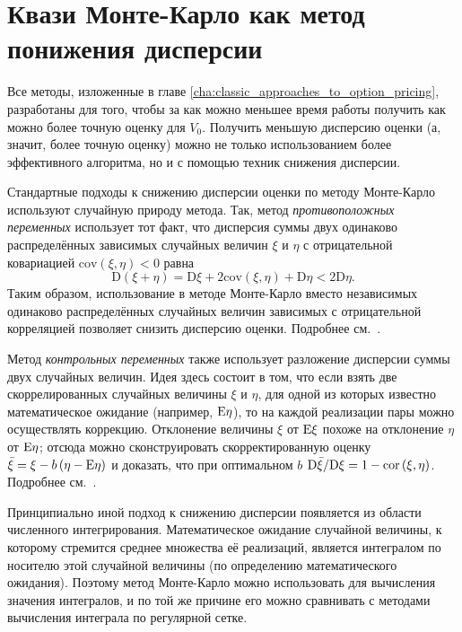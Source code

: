 \chapter{Квази Монте-Карло как метод понижения дисперсии} %
\label{cha:QMC_for_variance_reduction}

Все методы, изложенные в главе \ref{cha:classic_approaches_to_option_pricing}, разработаны для того, чтобы за как можно меньшее время работы получить как можно более точную оценку для $V_0$. Получить меньшую дисперсию оценки (а, значит, более точную оценку) можно не только использованием более эффективного алгоритма, но и с помощью техник снижения дисперсии. 

Стандартные подходы к снижению дисперсии оценки по методу Монте-Карло используют случайную природу метода. Так, метод \emph{противоположных переменных} использует тот факт, что дисперсия суммы двух одинаково распределённых зависимых случайных величин $\xi$ и $\eta$ с отрицательной ковариацией $\mathrm{cov}\left(\xi, \eta\right) < 0$ равна 
$$\mathrm D\left(\xi + \eta\right) = \mathrm D \xi + 2 \mathrm{cov}\left(\xi, \eta\right) + \mathrm D\eta < 2 \mathrm D\eta.$$
Таким образом, использование в методе Монте-Карло вместо независимых одинаково распределённых случайных величин зависимых с отрицательной корреляцией позволяет снизить дисперсию оценки. Подробнее см.~\cite[раздел~4.2, стр.~205]{Glasserman2004}.

Метод \emph{контрольных переменных} также использует разложение дисперсии суммы двух случайных величин. Идея здесь состоит в том, что если взять две скоррелированных случайных величины $\xi$ и $\eta$, для одной из которых известно математическое ожидание (например, $\mathrm{E}\eta$), то на каждой реализации пары можно осуществлять коррекцию. Отклонение величины $\xi$ от $\mathrm{E}\xi$ похоже на отклонение $\eta$ от $\mathrm{E}\eta$; отсюда можно сконструировать скорректированную оценку $\bar\xi = \xi - b\left(\eta - \mathrm{E}\eta\right)$ и доказать, что при оптимальном $b$ $\mathrm D \bar\xi / \mathrm D\xi = 1 - \operatorname{cor}\left(\xi, \eta\right)$. Подробнее см.~\cite[раздел~4.1, стр.~185]{Glasserman2004}.

Принципиально иной подход к снижению дисперсии появляется из области численного интегрирования. Математическое ожидание случайной величины, к которому стремится среднее множества её реализаций, является интегралом по носителю этой случайной величины (по определению математического ожидания). Поэтому метод Монте-Карло можно использовать для вычисления значения интегралов, и по той же причине его можно сравнивать с методами вычисления интеграла по регулярной сетке.

